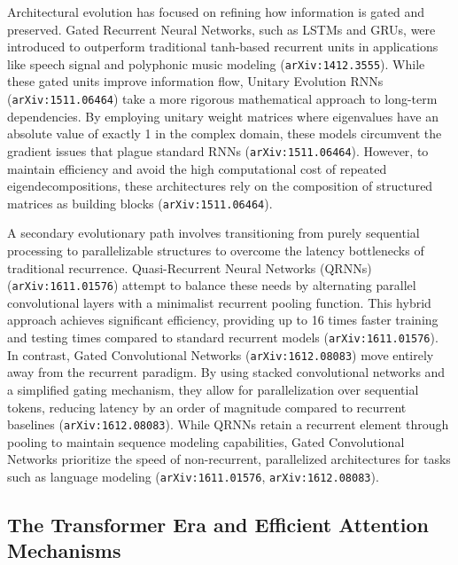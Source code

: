 \documentclass[11pt]{article}
\begin{document}
Architectural evolution has focused on refining how information is gated and preserved. Gated Recurrent Neural Networks, such as LSTMs and GRUs, were introduced to outperform traditional tanh-based recurrent units in applications like speech signal and polyphonic music modeling (\texttt{arXiv:1412.3555}). While these gated units improve information flow, Unitary Evolution RNNs (\texttt{arXiv:1511.06464}) take a more rigorous mathematical approach to long-term dependencies. By employing unitary weight matrices where eigenvalues have an absolute value of exactly 1 in the complex domain, these models circumvent the gradient issues that plague standard RNNs (\texttt{arXiv:1511.06464}). However, to maintain efficiency and avoid the high computational cost of repeated eigendecompositions, these architectures rely on the composition of structured matrices as building blocks (\texttt{arXiv:1511.06464}).

A secondary evolutionary path involves transitioning from purely sequential processing to parallelizable structures to overcome the latency bottlenecks of traditional recurrence. Quasi-Recurrent Neural Networks (QRNNs) (\texttt{arXiv:1611.01576}) attempt to balance these needs by alternating parallel convolutional layers with a minimalist recurrent pooling function. This hybrid approach achieves significant efficiency, providing up to 16 times faster training and testing times compared to standard recurrent models (\texttt{arXiv:1611.01576}). In contrast, Gated Convolutional Networks (\texttt{arXiv:1612.08083}) move entirely away from the recurrent paradigm. By using stacked convolutional networks and a simplified gating mechanism, they allow for parallelization over sequential tokens, reducing latency by an order of magnitude compared to recurrent baselines (\texttt{arXiv:1612.08083}). While QRNNs retain a recurrent element through pooling to maintain sequence modeling capabilities, Gated Convolutional Networks prioritize the speed of non-recurrent, parallelized architectures for tasks such as language modeling (\texttt{arXiv:1611.01576}, \texttt{arXiv:1612.08083}).

\subsection{The Transformer Era and Efficient Attention Mechanisms}
\end{document}
